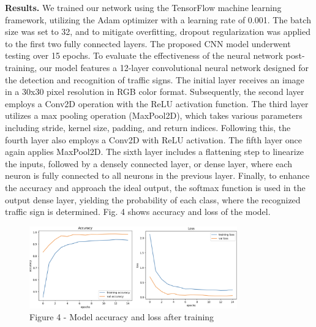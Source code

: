 \begin{multicols}{2}
{\bfseries Results.} We trained our network using the TensorFlow machine
learning framework, utilizing the Adam optimizer with a learning rate of
0.001. The batch size was set to 32, and to mitigate overfitting,
dropout regularization was applied to the first two fully connected
layers. The proposed CNN model underwent testing over 15 epochs. To
evaluate the effectiveness of the neural network post-training, our
model features a 12-layer convolutional neural network designed for the
detection and recognition of traffic signs. The initial layer receives
an image in a 30x30 pixel resolution in RGB color format. Subsequently,
the second layer employs a Conv2D operation with the ReLU activation
function. The third layer utilizes a max pooling operation (MaxPool2D),
which takes various parameters including stride, kernel size, padding,
and return indices. Following this, the fourth layer also employs a
Conv2D with ReLU activation. The fifth layer once again applies
MaxPool2D. The sixth layer includes a flattening step to linearize the
inputs, followed by a densely connected layer, or dense layer, where
each neuron is fully connected to all neurons in the previous layer.
Finally, to enhance the accuracy and approach the ideal output, the
softmax function is used in the output dense layer, yielding the
probability of each class, where the recognized traffic sign is
determined. Fig. 4 shows accuracy and loss of the model.
\end{multicols}

\begin{figure}[H]
	\centering
	\includegraphics[width=0.8\textwidth]{assets/60}
	\caption*{Figure 4 - Model accuracy and loss after training}
\end{figure}

